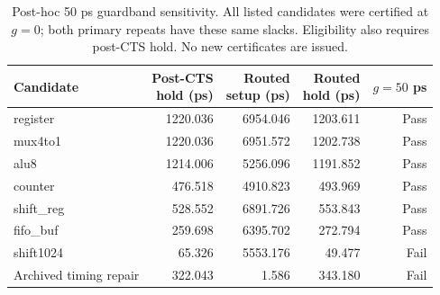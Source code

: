 \begin{table}[!htbp]\centering\small
\caption{Post-hoc 50 ps guardband sensitivity. All listed candidates were certified at $g=0$; both primary repeats have these same slacks. Eligibility also requires post-CTS hold. No new certificates are issued.}\label{tab:guardband}
\begin{tabular}{@{}lrrrr@{}}\toprule
Candidate & \shortstack{Post-CTS\\hold (ps)} & \shortstack{Routed\\setup (ps)} & \shortstack{Routed\\hold (ps)} & $g=50$ ps\\\midrule
register & 1220.036 & 6954.046 & 1203.611 & Pass\\
mux4to1 & 1220.036 & 6951.572 & 1202.738 & Pass\\
alu8 & 1214.006 & 5256.096 & 1191.852 & Pass\\
counter & 476.518 & 4910.823 & 493.969 & Pass\\
shift\_reg & 528.552 & 6891.726 & 553.843 & Pass\\
fifo\_buf & 259.698 & 6395.702 & 272.794 & Pass\\
shift1024 & 65.326 & 5553.176 & 49.477 & Fail\\
Archived timing repair & 322.043 & 1.586 & 343.180 & Fail\\
\bottomrule\end{tabular}\end{table}
